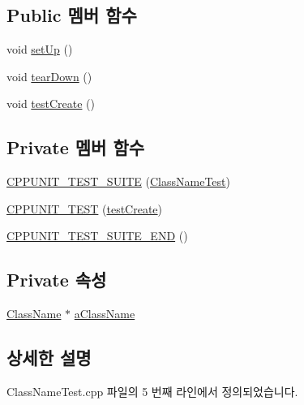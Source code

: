 \subsection*{Public 멤버 함수}
\begin{DoxyCompactItemize}
\item 
void \hyperlink{class_class_name_test_a63326a1b70b6e3f070e51687798e02de}{set\+Up} ()
\item 
void \hyperlink{class_class_name_test_ab804e0f66def63262c1d6b4e3d2a2bd7}{tear\+Down} ()
\item 
void \hyperlink{class_class_name_test_a0dc4c4586e1a48d47ba2b95f5ecd771e}{test\+Create} ()
\end{DoxyCompactItemize}
\subsection*{Private 멤버 함수}
\begin{DoxyCompactItemize}
\item 
\hyperlink{class_class_name_test_a66d96ca629374c58fa9e2bf7d7d5e291}{C\+P\+P\+U\+N\+I\+T\+\_\+\+T\+E\+S\+T\+\_\+\+S\+U\+I\+TE} (\hyperlink{class_class_name_test}{Class\+Name\+Test})
\item 
\hyperlink{class_class_name_test_accc9eb110693b2619d6b829843ffc966}{C\+P\+P\+U\+N\+I\+T\+\_\+\+T\+E\+ST} (\hyperlink{class_class_name_test_a0dc4c4586e1a48d47ba2b95f5ecd771e}{test\+Create})
\item 
\hyperlink{class_class_name_test_aac6c15d03f8d9865afffc7f091e99053}{C\+P\+P\+U\+N\+I\+T\+\_\+\+T\+E\+S\+T\+\_\+\+S\+U\+I\+T\+E\+\_\+\+E\+ND} ()
\end{DoxyCompactItemize}
\subsection*{Private 속성}
\begin{DoxyCompactItemize}
\item 
\hyperlink{class_class_name}{Class\+Name} $\ast$ \hyperlink{class_class_name_test_a3bb8b721228c57afb0dc7f11ea9f7a95}{a\+Class\+Name}
\end{DoxyCompactItemize}


\subsection{상세한 설명}


Class\+Name\+Test.\+cpp 파일의 5 번째 라인에서 정의되었습니다.



